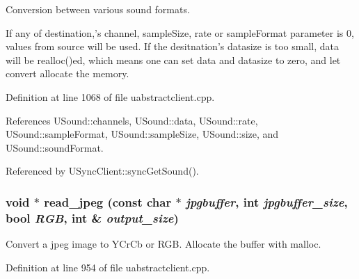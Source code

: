 Conversion between various sound formats. 

If any of destination,'s channel, sample\-Size, rate or sample\-Format parameter is 0, values from source will be used. If the desitnation's datasize is too small, data will be realloc()ed, which means one can set data and datasize to zero, and let convert allocate the memory. 

Definition at line 1068 of file uabstractclient.cpp.

References USound::channels, USound::data, USound::rate, USound::sample\-Format, USound::sample\-Size, USound::size, and USound::sound\-Format.

Referenced by USync\-Client::sync\-Get\-Sound().
\subsubsection{\setlength{\rightskip}{0pt plus 5cm}void $\ast$ read\_\-jpeg (const char $\ast$ {\em jpgbuffer}, int {\em jpgbuffer\_\-size}, bool {\em RGB}, int \& {\em output\_\-size})\hspace{0.3cm}{\tt  [static]}}\label{uabstractclient_8cpp_a6}


Convert a jpeg image to YCr\-Cb or RGB. Allocate the buffer with malloc. 

Definition at line 954 of file uabstractclient.cpp.